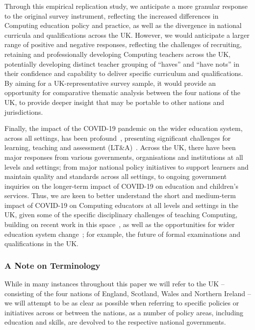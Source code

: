 \documentclass[]{interact}
\theoremstyle{plain}%
\theoremstyle{definition}
\theoremstyle{remark}
\begin{document}
{Through this empirical replication study, we anticipate a more
granular response to the original survey instrument, reflecting the
increased differences in Computing education policy and practice, as
well as the divergence in national curricula and qualifications across
the UK. However, we would anticipate a larger range of positive and
negative responses, reflecting the challenges of recruiting, retaining
and professionally developing Computing teachers across the UK,
potentially developing distinct teacher grouping of ``haves'' and
``have nots'' in their confidence and capability to deliver specific
curriculum and qualifications. By aiming for a UK-representative
survey sample, it would provide an opportunity for comparative
thematic analysis between the four nations of the UK, to provide
deeper insight that may be portable to other nations and
jurisdictions.

Finally, the impact of the COVID-19 pandemic on the wider education
system, across all settings, has been
profound~\citep{unescocovidedu:2020}, presenting significant
challenges for learning, teaching and assessment
(LT\&A)~\citep{oecd:2020}. Across the UK, there have been major
responses from various governments, organisations and institutions at
all levels and settings; from major national policy initiatives to
support learners and maintain quality and standards across all
settings, to ongoing government inquiries on the longer-term impact of
COVID-19 on education and children’s services. Thus, we are keen to
better understand the short and medium-term impact of COVID-19 on
Computing educators at all levels and settings in the UK, given some
of the specific disciplinary challenges of teaching Computing,
building on recent work in this
space~\citep{crick-et-al:ukicer2020,watermeyer-et-al:he2020}, as well
as the opportunities for wider education system
change~\citep{zhao:2020}; for example, the future of formal
examinations and qualifications in the UK.

\subsubsection*{A Note on Terminology}

While in many instances throughout this paper we will refer to the UK
-- consisting of the four nations of England, Scotland, Wales and
Northern Ireland -- we will attempt to be as clear as possible when
referring to specific policies or initiatives across or between the
nations, as a number of policy areas, including education and skills,
are devolved to the respective national governments.

}
\end{document}
